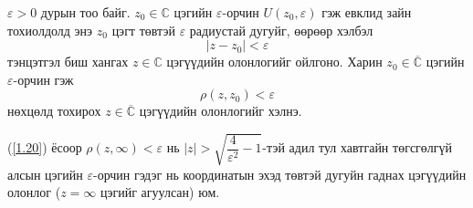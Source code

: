$\varepsilon >0$ дурын тоо байг. $z_0\in\mathbb{C}$ цэгийн $\varepsilon$-орчин  $U(z_0,\varepsilon)$ гэж евклид зайн тохиолдолд энэ $z_0$ цэгт төвтэй $\varepsilon$ радиустай дугуйг, өөрөөр хэлбэл
\begin{equation}
|z-z_0|<\varepsilon
\end{equation}
тэнцэтгэл биш хангах  $z\in \mathbb{C}$ цэгүүдийн олонлогийг ойлгоно. Харин $z_0\in\overline{\mathbb{C}}$ цэгийн $\varepsilon$-орчин гэж
\begin{equation}
\rho (z,z_0)<\varepsilon
\end{equation}
нөхцөлд тохирох $z\in \overline{\mathbb{C}}$ цэгүүдийн олонлогийг хэлнэ. 

(\ref{1.20}) ёсоор $\rho (z,\infty)<\varepsilon$ нь $|z|>\sqrt{\dfrac{4}{\varepsilon^2}-1}$-тэй адил тул хавтгайн төгсгөлгүй алсын цэгийн $\varepsilon$-орчин гэдэг нь координатын эхэд төвтэй дугуйн гаднах цэгүүдийн олонлог ($z=\infty$ цэгийг агуулсан) юм.

